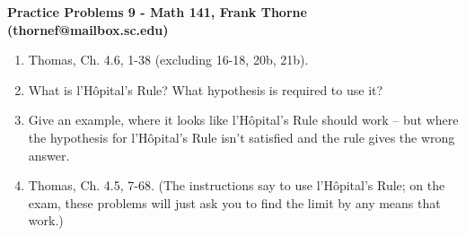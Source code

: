 \documentclass[12pt]{article}
\begin{document}
\setlength{\topmargin}{-2mm}





\begin{center}{\bf Practice Problems 9 - Math 141, Frank Thorne (thornef@mailbox.sc.edu)}

\medskip

\medskip

\end{center}
\vskip -0.1in

\begin{enumerate}
\item
Thomas, Ch. 4.6, 1-38 (excluding 16-18, 20b, 21b).

\item 
What is l'H\^{o}pital’s Rule? What hypothesis is required to use it?

\item
Give an example, where it looks like l'H\^{o}pital’s Rule should work – but where the hypothesis for
l'H\^{o}pital’s Rule isn’t satisfied and the rule gives the wrong answer.

\item
Thomas, Ch. 4.5, 7-68. (The instructions say to use l'H\^{o}pital’s Rule; on the exam, these problems will just ask you to find the limit by any means that work.)

\end{enumerate}
\end{document}
